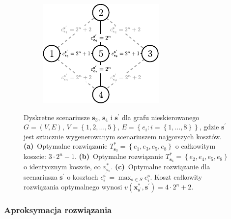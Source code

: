 \begin{figure}[!htbp]
\begin{subfigure}[b]{0.3\textwidth}
		\label{fig:minmaxregexample2:b}
	\end{subfigure}
	\hfill
	\begin{subfigure}[b]{0.3\textwidth}
		\includegraphics[width=\textwidth]{Chapter_II/MIN-MAX-REG2-example/c}
		\caption{}
		\label{fig:minmaxregexample2:c}
	\end{subfigure}
	\hfill\null
	\caption{
		Dyskretne scenariusze $\textbf{s}_{3}$, $\textbf{s}_{4}$ i $\textbf{s}^{\prime}$ dla grafu nieskierowanego $G = \left( V, E \right)$, $V = \left\{ 1, 2, \dots, 5 \right\}$, $E = \left\{ e_{i} : i = \left\{ 1, \dots, 8 \right\} \right\}$, gdzie $\textbf{s}^{\prime}$ jest sztucznie wygenerowanym scenariuszem najgorszych kosztów.
		\textbf{(a)}~Optymalne rozwiązanie $T^{\ast}_{\textbf{s}_{3}} = \left\{ e_{1}, e_{3}, e_{5}, e_{8} \right\}$ o całkowitym koszcie: $3 \cdot 2^{n} - 1$.
		\textbf{(b)}~Optymalne rozwiązanie $T^{\ast}_{\textbf{s}_{4}} = \left\{ e_{2}, e_{4}, e_{5}, e_{8} \right\}$ o identycznym koszcie, co $v^{\ast}_{\textbf{s}_{3}}$.
		\textbf{(c)}~Optymalne rozwiązanie dla scenariusza $\textbf{s}^{\prime}$ o kosztach $c_{i}^{\textbf{s}^{\prime}} = \max_{\textbf{s} \in S} c_{i}^{\textbf{s}}$. Koszt całkowity rozwiązania optymalnego wynosi $v \left( \textbf{x}^{\ast}_{\textbf{s}^{\prime}}, \textbf{s}^{\prime} \right) = 4 \cdot 2^{n} + 2$.
	}
	\label{fig:minmaxregexample2}
\end{figure}

\subsubsection{Aproksymacja rozwiązania}

